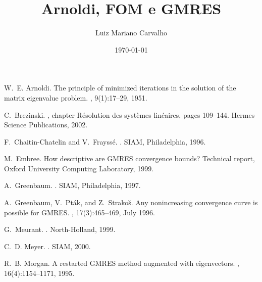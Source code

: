 \documentclass{article}
\title{Arnoldi, FOM e GMRES}
\author{ Luiz Mariano  Carvalho }
\date{\today
}
\begin{document}
	
\maketitle







\begin{thebibliography}{100}
	
     W.~E. Arnoldi. \newblock The principle of minimized iterations in the solution of the
    matrix
  eigenvalue problem.
, 9(1):17--29, 1951.

     C.~Brezinski. ,
    chapter
  Résolution des systèmes linéaires, pages 109--144.
\newblock Hermes Science Publications, 2002.


 F.~{Chaitin-Chatelin} and V.~Frayssé. . \newblock SIAM, Philadelphia, 1996.

 M.~Embree. \newblock How descriptive are {GMRES} convergence bounds? \newblock Technical
report, Oxford University Computing Laboratory, 1999.

	
     A.~Greenbaum. .
    \newblock SIAM, Philadelphia, 1997.
	
	 A.~Greenbaum, V.~Pták, and Z.~Strako{\u{s}}. \newblock Any nonincreasing
	convergence curve is possible for {GMRES}. ,
	17(3):465--469, July 1996.
	

		
	



	

     G.~Meurant. . \newblock
    North-Holland, 1999.

	
	 C.~D. Meyer. . \newblock SIAM,
	2000.
	
 R.~B. Morgan. \newblock A restarted {GMRES} method augmented with eigenvectors.
    ,
  16(4):1154--1171, 1995.



\end{thebibliography}
\end{document}
